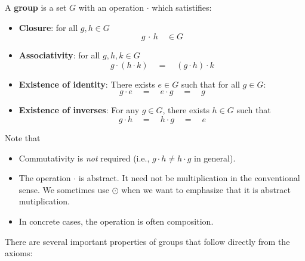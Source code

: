 \documentclass[12pt]{article}
\begin{document}
\noindent
A \textbf{group} is a set $G$ with an operation $\cdot$ which satistifies:
\begin{itemize}
  \item \textbf{Closure}:  for all $g, h \in G$  
    \begin{equation*}
      g \, \cdot \, h \quad \in G 
    \end{equation*}

  \item \textbf{Associativity}:  for all $g, h, k \in G$  
    \begin{equation*}
      g \cdot (h \cdot k) \quad = \quad (g \cdot h) \cdot k
    \end{equation*}

  \item \textbf{Existence of identity}: There exists $e \in G$ such that for all $g \in G$:
    \begin{equation*}
      g \cdot e \quad = \quad e \cdot g \quad = \quad g 
    \end{equation*}

  \item \textbf{Existence of inverses}: For any $g \in G$, there exists $h \in G$ such that
    \begin{equation*}
      g \cdot h \quad = \quad h \cdot g \quad = \quad e
    \end{equation*}
\end{itemize}
Note that 
\begin{itemize}
  \item Commutativity is \emph{not} required (i.e., $g \cdot h \neq h
    \cdot g$ in general).
  \item The operation $\cdot$ is abstract.  It need not be
    multiplication in the conventional sense.  We sometimes use
    $\odot$ when we want to emphasize that it is abstract
    mutiplication.
  \item In concrete cases, the operation is often composition.
\end{itemize}
There are several important properties of groups that follow directly from the axioms:
\end{document}
